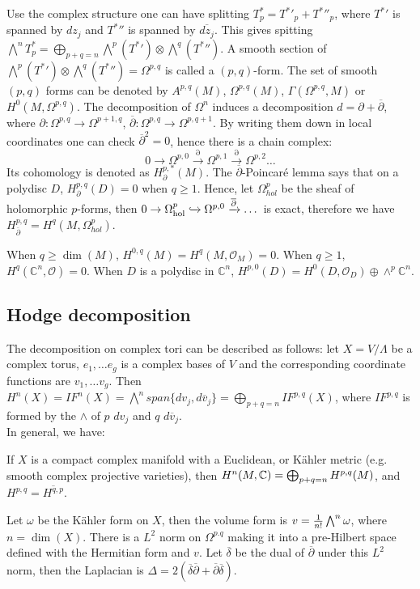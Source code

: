 Use the complex structure one can have splitting $T^*_p={T^*}'_p+{T^*}{''}_p$, where ${T^*}'$ is spanned by $dz_j$ and ${T^*}{''}$ is spanned by $\overline{dz_j}$. This gives spitting $\bigwedge^nT^*_p=\bigoplus_{p+q=n}\bigwedge^p({T^*}')\otimes \bigwedge^q({T^*}{''})$. A smooth section of $\bigwedge^p({T^*}')\otimes \bigwedge^q({T^*}{''})=\Omega^{p,q}$ is called a $(p,q)$-form. The set of smooth $(p,q)$ forms can be denoted by $A^{p,q}(M)$, $\Omega^{p,q}(M)$, $\Gamma(\Omega^{p,q},M)$ or $H^0(M,\Omega^{p,q})$. The decomposition of $\Omega^n$ induces a decomposition $d=\partial+\overline{\partial}$, where $\partial: \Omega^{p,q}\rightarrow\Omega^{p+1,q}$, $\overline{\partial}:\Omega^{p,q}\rightarrow\Omega^{p,q+1}$. By writing them down in local coordinates one can check $\overline{\partial}^2=0$, hence there is a chain complex:
$$0\rightarrow\Omega^{p,0}\xrightarrow{\partial}\Omega^{p,1}\xrightarrow{\partial}\Omega^{p,2}\dots$$
Its cohomology is denoted as $H^{p,*}_\partial(M)$. 
The $\overline{\partial}$-Poincar\'e lemma says that on a polydisc $D$, $H^{p,q}_\partial(D)=0$ when $q\geq 1$. Hence, let $\Omega^p_{hol}$ be the sheaf of holomorphic $p$-forms, then $0 \rightarrow\Omega^p_{\rm hol} \xhookrightarrow{}\Omega^{p,0} \xrightarrow{\overline{\partial}}\dots$ is exact, therefore we have $H^{p,q}_{\overline{\partial}}=H^q(M,\Omega^p_{hol})$. \\

\begin{example}
When $q\geq\dim(M)$, $H^{0,q}(M)=H^q(M,\mathcal{O}_M)=0$. When $q\geq 1$, $H^q(\mathbb{C}^n,\mathcal{O})=0$. When $D$ is a polydisc in $\mathbb{C}^n$, $H^{p,0}(D)=H^0(D,\mathcal{O}_D)\oplus\wedge^p\mathbb{C}^n$. 	
\end{example}

\subsection{Hodge decomposition}
The decomposition on complex tori can be described as follows: let $X=V/\Lambda$ be a complex torus, $e_1,\dots e_g$ is a complex bases of $V$ and the corresponding coordinate functions are $v_1,\dots v_g$. Then $H^n(X)=IF^n(X)=\bigwedge^n span\{dv_j,d\overline{v}_j\}=\bigoplus_{p+q=n}IF^{p,q}(X)$, where $IF^{p,q}$ is formed by the $\wedge$ of $p$ $dv_j$ and $q$ $d\overline{v}_j$.\\
 
In general, we have: 
\begin{theorem}
	If $X$ is a compact complex manifold with a Euclidean, or K\"ahler metric (e.g. smooth complex projective varieties), then $H^n(M , {\mathbb C})=\bigoplus_{p+q=n}H^{p,q}(M)$, and $H^{p,q}=\overline{H^{q,p}}$.
\end{theorem}

Let $\omega$ be the K\"ahler form on $X$, then the volume form is $v={1\over n!}\bigwedge^n\omega$, where $n=\dim(X)$. There is a $L^2$ norm on $\Omega^{p.q}$ making it into a pre-Hilbert space defined with the Hermitian form and $v$. Let $\overline{\delta}$ be the dual of $\overline{\partial}$ under this $L^2$ norm, then the Laplacian is $\Delta=2(\overline{\delta}\overline{\partial}+\overline{\partial}\overline{\delta})$.